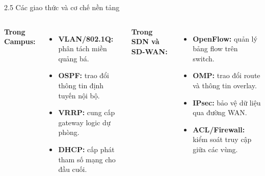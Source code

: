 \begin{frame}{2.5 Các giao thức và cơ chế nền tảng}
    \begin{columns}[T]
        \textbf{Trong Campus:}
        \begin{itemize}
            \item \textbf{VLAN/802.1Q:} phân tách miền quảng bá.
            \item \textbf{OSPF:} trao đổi thông tin định tuyến nội bộ.
            \item \textbf{VRRP:} cung cấp gateway logic dự phòng.
            \item \textbf{DHCP:} cấp phát tham số mạng cho đầu cuối.
        \end{itemize}

        \textbf{Trong SDN và SD-WAN:}
        \begin{itemize}
            \item \textbf{OpenFlow:} quản lý bảng flow trên switch.
            \item \textbf{OMP:} trao đổi route và thông tin overlay.
            \item \textbf{IPsec:} bảo vệ dữ liệu qua đường WAN.
            \item \textbf{ACL/Firewall:} kiểm soát truy cập giữa các vùng.
        \end{itemize}
    \end{columns}
\end{frame}

